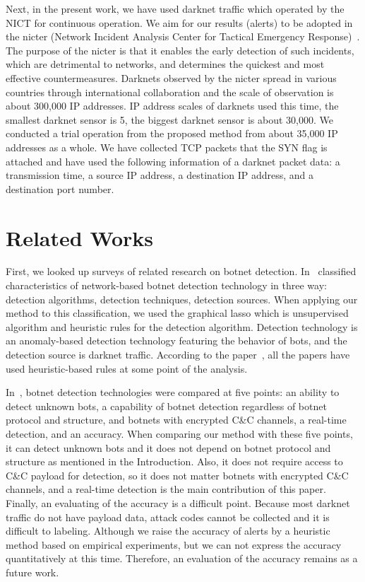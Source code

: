 \documentclass{sig-alternate-10pt}
\begin{document}
Next, in the present work, we have used darknet traffic which operated by the NICT for continuous operation.
We aim for our results (alerts) to be adopted in the nicter (Network Incident Analysis Center for Tactical Emergency Response)~\cite{NICTERWEB, Nakao}.
The purpose of the nicter is that it enables the early detection of such incidents, which are detrimental to networks, and determines the quickest and most effective countermeasures.
Darknets observed by the nicter spread in various countries through international collaboration and the scale of observation is about 300,000 IP addresses.
IP address scales of darknets used this time, the smallest darknet sensor is 5, the biggest darknet sensor is about 30,000.
We conducted a trial operation from the proposed method from about 35,000 IP addresses as a whole.
We have collected TCP packets that the SYN flag is attached and have used the following information of a darknet packet data: a transmission time, a source IP address, a destination IP address, and a destination port number.


\section{Related Works}
First, we looked up surveys of related research on botnet detection.
In~\cite{Garcia} classified characteristics of network-based botnet detection technology in three way: detection algorithms, detection techniques, detection sources.
When applying our method to this classification, we used the graphical lasso which is unsupervised algorithm and heuristic rules for the detection algorithm.  
Detection technology is an anomaly-based detection technology featuring the behavior of bots, and the detection source is darknet traffic.
According to the paper~\cite{Garcia}, all the papers have used heuristic-based rules at some point of the analysis.

In~\cite{Feily}, botnet detection technologies were compared at five points: an ability to detect unknown bots, a capability of botnet detection regardless of botnet protocol and structure, and botnets with encrypted C\&C channels, a real-time detection, and an accuracy.
When comparing our method with these five points, it can detect unknown bots and it does not depend on botnet protocol and structure as mentioned in the Introduction.
Also, it does not require access to C\&C payload for detection, so it does not matter botnets with encrypted C\&C channels, and a real-time detection is the main contribution of this paper.
Finally, an evaluating of the accuracy is a difficult point.
Because most darknet traffic do not have payload data, attack codes cannot be collected and it is difficult to labeling.
Although we raise the accuracy of alerts by a heuristic method based on empirical experiments, but we can not express the accuracy quantitatively at this time.
Therefore, an evaluation of the accuracy remains as a future work.
\end{document}
